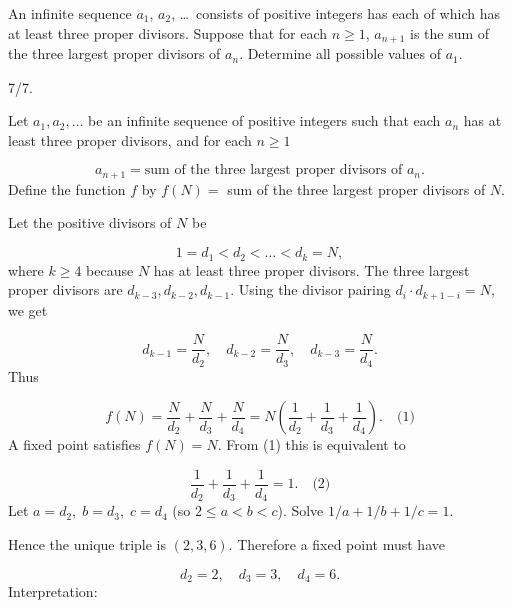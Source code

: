 \begin{mdframed}[style=mdpurplebox,frametitle={IMO 2025 Problem 4}]
An infinite sequence $a_1$, $a_2$, \dots\ consists of positive integers
has each of which has at least three proper divisors.
Suppose that for each $n\geq 1$,
$a_{n+1}$ is the sum of the three largest proper divisors of $a_n$.
Determine all possible values of $a_1$.
\end{mdframed}
\begin{remark*}
  7/7.
\end{remark*}
Let \(a_1,a_2,\dots\) be an infinite sequence of positive integers such that each \(a_n\) has at least three proper divisors, and for each \(n\ge 1\)\par
\[
a_{n+1}=\text{sum of the three largest proper divisors of }a_n.
\]
Define the function \(f\) by \(f(N) =\) sum of the three largest proper divisors of \(N\).\par
\smallskip
{}
Let the positive divisors of \(N\) be\par
\[
1=d_1<d_2<\dots<d_k=N,
\]
where \(k\ge4\) because \(N\) has at least three proper divisors. The three largest proper divisors are \(d_{k-3}, d_{k-2}, d_{k-1}\). Using the divisor pairing \(d_i\cdot d_{k+1-i}=N\), we get\par
\[
d_{k-1}=\frac{N}{d_2},\quad d_{k-2}=\frac{N}{d_3},\quad d_{k-3}=\frac{N}{d_4}.
\]
Thus\par
\[
f(N)=\frac{N}{d_2}+\frac{N}{d_3}+\frac{N}{d_4}=N\left(\frac{1}{d_2}+\frac{1}{d_3}+\frac{1}{d_4}\right). \quad\text{(1)}
\]
\smallskip
{}
A fixed point satisfies \(f(N)=N\). From (1) this is equivalent to\par
\[
\frac{1}{d_2}+\frac{1}{d_3}+\frac{1}{d_4}=1. \quad\text{(2)}
\]
Let \(a=d_2,\;b=d_3,\;c=d_4\) (so \(2\le a<b<c\)). Solve \(1/a+1/b+1/c=1\).\par
{}
Hence the unique triple is \((2,3,6)\). Therefore a fixed point must have\par
\[
d_2=2,\quad d_3=3,\quad d_4=6.
\]
Interpretation:\par
